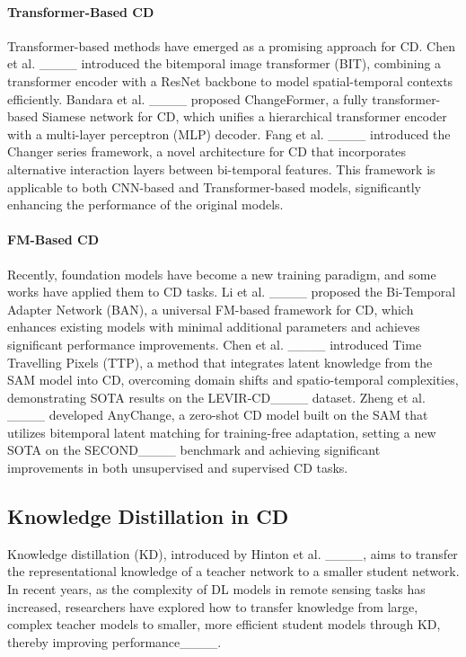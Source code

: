\paragraph{Transformer-Based CD}  
Transformer-based methods have emerged as a promising approach for CD. 
Chen et al. ____ introduced the bitemporal image transformer (BIT), combining a transformer encoder with a ResNet backbone to model spatial-temporal contexts efficiently. 
Bandara et al. ____ proposed ChangeFormer, a fully transformer-based Siamese network for CD, which unifies a hierarchical transformer encoder with a multi-layer perceptron (MLP) decoder.
Fang et al. ____ introduced the Changer series framework, a novel architecture for CD that incorporates alternative interaction layers between bi-temporal features. 
This framework is applicable to both CNN-based and Transformer-based models, significantly enhancing the performance of the original models.

\paragraph{FM-Based CD}  
Recently, foundation models have become a new training paradigm, and some works have applied them to CD tasks.
Li et al. ____ proposed the Bi-Temporal Adapter Network (BAN), a universal FM-based framework for CD, which enhances existing models with minimal additional parameters and achieves significant performance improvements.
Chen et al. ____ introduced Time Travelling Pixels (TTP), a method that integrates latent knowledge from the SAM model into CD, overcoming domain shifts and spatio-temporal complexities, demonstrating SOTA results on the LEVIR-CD____ dataset.
Zheng et al. ____ developed AnyChange, a zero-shot CD model built on the SAM that utilizes bitemporal latent matching for training-free adaptation, setting a new SOTA on the SECOND____ benchmark and achieving significant improvements in both unsupervised and supervised CD tasks.

\subsection{Knowledge Distillation in CD}

Knowledge distillation (KD), introduced by Hinton et al. ____, aims to transfer the representational knowledge of a teacher network to a smaller student network. 
In recent years, as the complexity of DL models in remote sensing tasks has increased, researchers have explored how to transfer knowledge from large, complex teacher models to smaller, more efficient student models through KD, thereby improving performance____.

